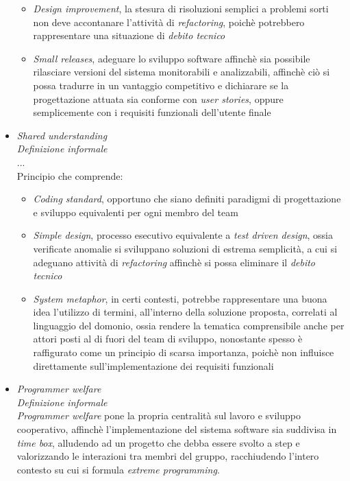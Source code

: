 \documentclass{article}
\begin{document}
\begin{itemize}[label={-}]
\begin{itemize}
        \item \textit{Design improvement}, la stesura di risoluzioni semplici a problemi sorti non deve accontanare l'attività di \textit{refactoring}, poichè potrebbero rappresentare una situazione di \textit{debito tecnico}
        \item \textit{Small releases}, adeguare lo sviluppo software affinchè sia possibile rilasciare versioni del sistema monitorabili e analizzabili, affinchè ciò si possa tradurre in un vantaggio competitivo e dichiarare se la progettazione attuata sia conforme con \textit{user stories}, oppure semplicemente con i requisiti funzionali dell'utente finale
    \end{itemize}
    \item \textit{Shared understanding}\vspace*{7pt}\\
    \textit{Definizione informale}\\
    ...\vspace*{7pt}\\
    Principio che comprende:
    \begin{itemize}
        \item \textit{Coding standard}, opportuno che siano definiti paradigmi di progettazione e sviluppo equivalenti per ogni membro del team 
        \item \textit{Simple design}, processo esecutivo equivalente a \textit{test driven design}, ossia verificate anomalie si sviluppano soluzioni di estrema semplicità, a cui si adeguano attività di \textit{refactoring} affinchè si possa eliminare il \textit{debito tecnico} 
        \item \textit{System metaphor}, in certi contesti, potrebbe rappresentare una buona idea l'utilizzo di termini, all'interno della soluzione proposta, correlati al linguaggio del domonio, ossia rendere la tematica comprensibile anche per attori posti al di fuori del team di sviluppo, nonostante spesso è raffigurato come un principio di scarsa importanza, poichè non influisce direttamente sull'implementazione dei requisiti funzionali
    \end{itemize}
    \item \textit{Programmer welfare}\vspace*{7pt}\\
    \textit{Definizione informale}\\
    \textit{Programmer welfare} pone la propria centralità sul lavoro e sviluppo cooperativo, affinchè l'implementazione del sistema software sia suddivisa in \textit{time box}, alludendo ad un progetto che debba essere svolto a step e valorizzando le interazioni tra membri del gruppo, racchiudendo l'intero contesto su cui si formula \textit{extreme programming}.
\end{itemize}
\end{document}

